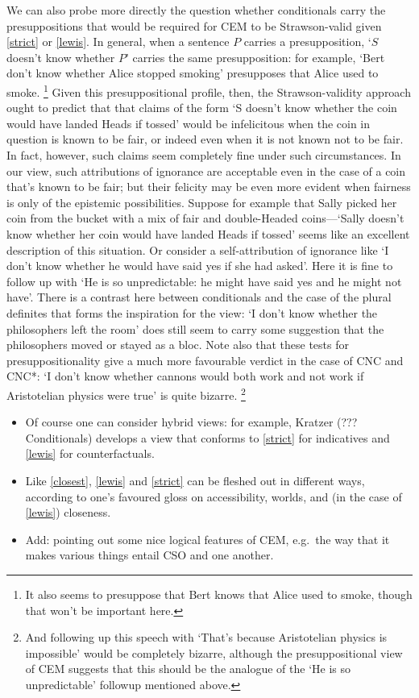 \documentclass[If.tex]{subfiles}
\begin{document}
We can also probe more directly the question whether conditionals carry the presuppositions that would be required for CEM to be Strawson-valid given \ref{strict} or \ref{lewis}.  In general, when a sentence $P$ carries a presupposition, ‘$S$ doesn't know whether $P$’ carries the same presupposition: for example, ‘Bert don't know whether Alice stopped smoking’ presupposes that Alice used to smoke.%
\footnote{It also seems to presuppose that Bert knows that Alice used to smoke, though that won't be important here.}
Given this presuppositional profile, then, the Strawson-validity approach ought to predict that that claims of the form ‘S doesn't know whether the coin would have landed Heads if tossed’ would be infelicitous when the coin in question is known to be fair, or indeed even when it is not known not to be fair.  In fact, however, such claims seem completely fine under such circumstances.  In our view, such attributions of ignorance are acceptable even in the case of a coin that's known to be fair; but their felicity may be even more evident when fairness is only of the epistemic possibilities.   Suppose for example that Sally picked her coin from the bucket with a mix of fair and double-Headed coins---‘Sally doesn't know whether her coin would have landed Heads if tossed’ seems like an excellent description of this situation.  Or consider a self-attribution of ignorance like ‘I don't know whether he would have said yes if she had asked’.  Here it is fine to follow up with ‘He is so unpredictable: he might have said yes and he might not have’.  There is a contrast here between conditionals and the case of the plural definites that forms the inspiration for the view: ‘I don't know whether the philosophers left the room’ does still seem to carry some suggestion that the philosophers moved or stayed as a bloc.  Note also that these tests for presuppositionality give a much more favourable verdict in the case of CNC and CNC*: ‘I don't know whether cannons would both work and not work if Aristotelian physics were true’ is quite bizarre.%
\footnote{And following up this speech with ‘That's because Aristotelian physics is impossible’ would be completely bizarre, although the presuppositional view of CEM suggests that this should be the analogue of the ‘He is so unpredictable’ followup mentioned above.}



	\begin{itemize}
		\item
		Of course one can consider hybrid views: for example, Kratzer (???Conditionals) develops a view that conforms to \ref{strict} for indicatives and \ref{lewis} for counterfactuals.
		\item
		Like \ref{closest}, \ref{lewis} and \ref{strict} can be fleshed out in different ways,
		according to one's favoured gloss on accessibility, worlds, and (in
		the case of \ref{lewis}) closeness.
		\item
		Add: pointing out some nice logical features of CEM, e.g.~the way that
		it makes various things entail CSO and one another.
	\end{itemize}
\end{document}
